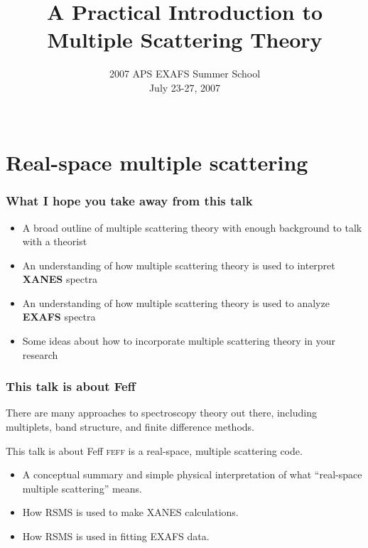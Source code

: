\documentclass[10pt, xcolor=x11names, compress]{beamer}
\title{A Practical Introduction to Multiple Scattering Theory}
\date[APS EXAFS 07]{2007 APS EXAFS Summer School\\July 23-27, 2007\\~}
\begin{document}
\begin{frame}
  \titlepage
\end{frame}






\section{Real-space multiple scattering}
%

\begin{frame}
  \frametitle{What I hope you take away from this talk}
  \begin{itemize}
  \item A broad outline of multiple scattering theory with enough
    background to talk with a theorist
  \item An understanding of how multiple scattering theory is used to
    interpret \textbf{XANES} spectra
  \item An understanding of how multiple scattering theory is used to
    analyze \textbf{EXAFS} spectra
  \item Some ideas about how to incorporate multiple scattering theory
    in your research
  \end{itemize}
\end{frame}

\begin{frame}
  \frametitle{This talk is about Feff}

  There are many approaches to spectroscopy theory out there,
  including multiplets, band structure, and finite difference methods.

  \bigskip

  \begin{exampleblock}{This talk is about Feff}
    \textsc{feff} is a real-space, multiple scattering code.
  \end{exampleblock}
  
  \bigskip

  \begin{itemize}
  \item A conceptual summary and simple physical interpretation of
    what ``real-space multiple scattering'' means.
  \item How RSMS is used to make XANES calculations.
  \item How RSMS is used in fitting EXAFS data.
  \end{itemize}
\end{frame}
\end{document}
